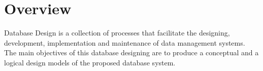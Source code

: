 \documentclass[../../DD.tex]{subfiles}
\begin{document}
\section{Overview}

	Database Design is a collection of processes that facilitate the designing, development, implementation and maintenance of  data management systems. \\
	The main objectives of this database designing are to produce a conceptual and a logical design models of the proposed database system.
	
\end{document}
